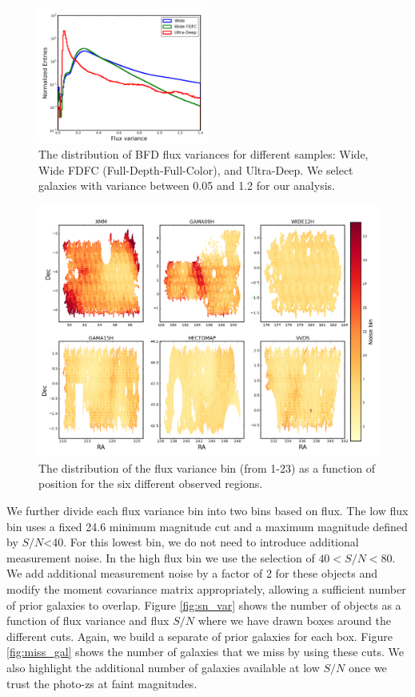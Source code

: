 \documentclass[useAMS,usenatbib]{mnras}
\begin{document}
\begin{figure}
    \includegraphics[width=0.5\textwidth]{flux_var.png}
    \caption{
       The distribution of BFD flux variances for different samples: Wide, Wide FDFC (Full-Depth-Full-Color), and Ultra-Deep.  We select galaxies with variance between 0.05 and 1.2 for our analysis.
    }
    \label{fig:flux_var}
\end{figure}


\begin{figure}
    \includegraphics[width=\textwidth]{radec_noise_bin.png}
    \caption{
       The distribution of the flux variance bin (from 1-23) as a function of position for the six different observed regions.
    }
    \label{fig:radec_noise_bin}
\end{figure}


We further divide each flux variance bin into two bins based on flux. The low flux bin uses a fixed 24.6 minimum magnitude cut and a maximum magnitude defined by $S/N$<40.  For this lowest bin, we do not need to introduce additional measurement noise.  In the high flux bin we use the selection of $40<S/N<80$. We add additional measurement noise by a factor of 2 for these objects and modify the moment covariance matrix appropriately, allowing a sufficient number of prior galaxies to overlap.  Figure \ref{fig:sn_var} shows the number of objects as a function of flux variance and flux $S/N$ where we have drawn boxes around the different cuts.  Again, we build a separate of prior galaxies for each box.  Figure \ref{fig:miss_gal} shows the number of galaxies that we miss by using these cuts.  We also highlight the additional number of galaxies available at low $S/N$ once we trust the photo-zs at faint magnitudes.
\end{document}
